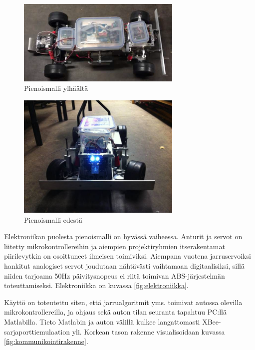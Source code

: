 \documentclass{article}
\begin{document}
\begin{figure}[p]
\centering
\includegraphics[width=0.7\textwidth]{images/autoylhaalta}
\caption{Pienoismalli ylhäältä}
\label{fig:autoylhaalta}
\end{figure}

\begin{figure}[p]
\centering
\includegraphics[width=0.7\textwidth]{images/autoedesta}
\caption{Pienoismalli edestä}
\label{fig:autoedesta}
\end{figure}

Elektroniikan puolesta pienoismalli on hyvässä vaiheessa. Anturit ja servot on liitetty mikrokontrollereihin ja aiempien projektiryhmien itserakentamat piirilevytkin on osoittuneet ilmeisen toimiviksi. Aiempana vuotena jarruservoiksi hankitut analogiset servot joudutaan nähtävästi vaihtamaan digitaalisiksi, sillä niiden tarjoama 50Hz päivitysnopeus ei riitä toimivan ABS-järjestelmän toteuttamiseksi. Elektroniikka on kuvassa \ref{fig:elektroniikka}.

Käyttö on toteutettu siten, että jarrualgoritmit yms. toimivat autossa olevilla mikrokontrollereilla, ja ohjaus sekä auton tilan seuranta tapahtuu PC:llä Matlabilla. Tieto Matlabin ja auton välillä kulkee langattomasti XBee-sarjaporttiemulaation yli. Korkean tason rakenne visualisoidaan kuvassa \ref{fig:kommunikointirakenne}.
\end{document}
